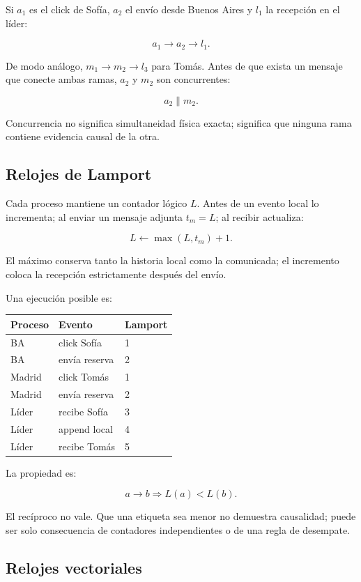 \documentclass[variant=apuntes,cover=institutional,mode=screen]{ua-engineering-v6-article}
\begin{document}
Si \(a_1\) es el click de Sofía, \(a_2\) el envío desde Buenos Aires y \(l_1\) la recepción en el líder:

\[
a_1\rightarrow a_2\rightarrow l_1.
\]

De modo análogo, \(m_1\rightarrow m_2\rightarrow l_3\) para Tomás. Antes de que exista un mensaje que conecte ambas ramas, \(a_2\) y \(m_2\) son concurrentes:

\[
a_2\parallel m_2.
\]

Concurrencia no significa simultaneidad física exacta; significa que ninguna rama contiene evidencia causal de la otra.

\subsection{Relojes de Lamport}

Cada proceso mantiene un contador lógico \(L\). Antes de un evento local lo incrementa; al enviar un mensaje adjunta \(t_m=L\); al recibir actualiza:

\[
L\leftarrow\max(L,t_m)+1.
\]

El máximo conserva tanto la historia local como la comunicada; el incremento coloca la recepción estrictamente después del envío.

Una ejecución posible es:

\begin{center}
\begin{tabular}{lll}
\toprule
Proceso & Evento & Lamport\\
\midrule
BA & click Sofía & 1\\
BA & envía reserva & 2\\
Madrid & click Tomás & 1\\
Madrid & envía reserva & 2\\
Líder & recibe Sofía & 3\\
Líder & append local & 4\\
Líder & recibe Tomás & 5\\
\bottomrule
\end{tabular}
\end{center}

La propiedad es:

\[
a\rightarrow b\Longrightarrow L(a)<L(b).
\]

El recíproco no vale. Que una etiqueta sea menor no demuestra causalidad; puede ser solo consecuencia de contadores independientes o de una regla de desempate.

\subsection{Relojes vectoriales}
\end{document}
